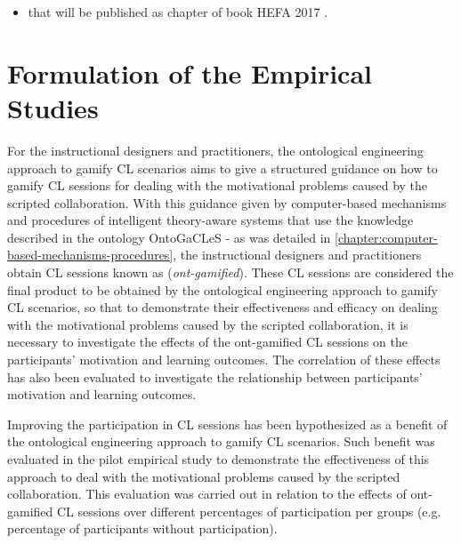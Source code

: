 \begin{itemize}
\item
{} that will be published as chapter of book  HEFA 2017 \cite{ChallcoMizoguchiIsotani2017}.
\end{itemize}

\section{Formulation of the Empirical Studies}
\label{sec:formulation-empirical-studies}

For the instructional designers and practitioners, the ontological engineering approach to gamify CL scenarios aims to give a structured guidance on how to gamify CL sessions for dealing with the motivational problems caused by the scripted collaboration. With this guidance given by computer-based mechanisms and procedures of intelligent theory-aware systems that use the knowledge described in the ontology OntoGaCLeS - as was detailed in \autoref{chapter:computer-based-mechanisms-procedures}, the instructional designers and practitioners obtain CL sessions known as  (\emph{ont-gamified}). These CL sessions are considered the final product to be obtained by the ontological engineering approach to gamify CL scenarios, so that to demonstrate their effectiveness and efficacy on dealing with the motivational problems caused by the scripted collaboration, it is necessary to investigate the effects of the ont-gamified CL sessions on the participants' motivation and learning outcomes. The correlation of these effects has also been evaluated to investigate the relationship between participants' motivation and learning outcomes.

Improving the participation in CL sessions has been hypothesized as a benefit of the ontological engineering approach to gamify CL scenarios. Such benefit was evaluated in the pilot empirical study to demonstrate the effectiveness of this approach to deal with the motivational problems caused by the scripted collaboration. This evaluation was carried out in relation to the effects of ont-gamified CL sessions over different percentages of participation per groups (e.g. percentage of participants without participation).

